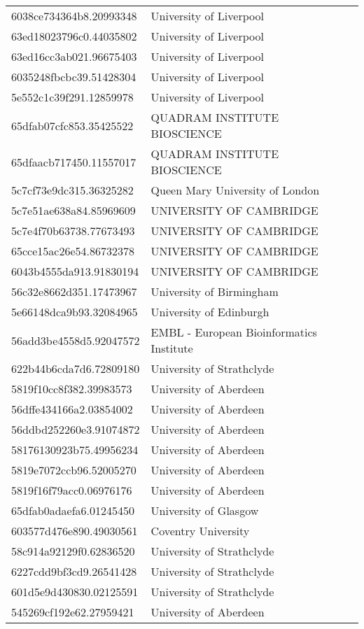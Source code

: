 \begin{tabular}{ll}
6038ce734364b8.20993348 & University of Liverpool \\
63ed18023796c0.44035802 & University of Liverpool \\
63ed16cc3ab021.96675403 & University of Liverpool \\
6035248fbcbc39.51428304 & University of Liverpool \\
5e552c1c39f291.12859978 & University of Liverpool \\
65dfab07cfc853.35425522 & QUADRAM INSTITUTE BIOSCIENCE \\
65dfaacb717450.11557017 & QUADRAM INSTITUTE BIOSCIENCE \\
5c7cf73e9dc315.36325282 & Queen Mary University of London \\
5c7e51ae638a84.85969609 & UNIVERSITY OF CAMBRIDGE \\
5c7e4f70b63738.77673493 & UNIVERSITY OF CAMBRIDGE \\
65cce15ac26e54.86732378 & UNIVERSITY OF CAMBRIDGE \\
6043b4555da913.91830194 & UNIVERSITY OF CAMBRIDGE \\
56c32e8662d351.17473967 & University of Birmingham \\
5e66148dca9b93.32084965 & University of Edinburgh \\
56add3be4558d5.92047572 & EMBL - European Bioinformatics Institute \\
622b44b6cda7d6.72809180 & University of Strathclyde \\
5819f10cc8f382.39983573 & University of Aberdeen \\
56dffe434166a2.03854002 & University of Aberdeen \\
56ddbd252260e3.91074872 & University of Aberdeen \\
58176130923b75.49956234 & University of Aberdeen \\
5819e7072ccb96.52005270 & University of Aberdeen \\
5819f16f79acc0.06976176 & University of Aberdeen \\
65dfab0adaefa6.01245450 & University of Glasgow \\
603577d476e890.49030561 & Coventry University \\
58c914a92129f0.62836520 & University of Strathclyde \\
6227cdd9bf3cd9.26541428 & University of Strathclyde \\
601d5e9d430830.02125591 & University of Strathclyde \\
545269cf192e62.27959421 & University of Aberdeen \\

\end{tabular}
